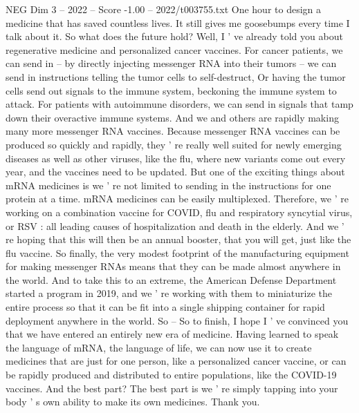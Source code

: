 \begin{textsample}{NEG Dim 3 – 2022 – Score -1.00 – 2022/t003755.txt}
One hour to design a medicine that has saved countless lives.
It still gives me goosebumps every time I talk about it.
So what does the future hold?
Well, I ' ve already told you about regenerative medicine and personalized cancer vaccines.
For cancer patients, we can send in -- by directly injecting messenger RNA into their tumors -- we can send in instructions telling the tumor cells to self-destruct, Or having the tumor cells send out signals to the immune system, beckoning the immune system to attack.
For patients with autoimmune disorders, we can send in signals that tamp down their overactive immune systems.
And we and others are rapidly making many more messenger RNA vaccines.
Because messenger RNA vaccines can be produced so quickly and rapidly, they ' re really well suited for newly emerging diseases as well as other viruses, like the flu, where new variants come out every year, and the vaccines need to be updated.
But one of the exciting things about mRNA medicines is we ' re not limited to sending in the instructions for one protein at a time. mRNA medicines can be easily multiplexed.
Therefore, we ' re working on a combination vaccine for COVID, flu and respiratory syncytial virus, or RSV : all leading causes of hospitalization and death in the elderly.
And we ' re hoping that this will then be an annual booster, that you will get, just like the flu vaccine.
So finally, the very modest footprint of the manufacturing equipment for making messenger RNAs means that they can be made almost anywhere in the world.
And to take this to an extreme, the American Defense Department started a program in 2019, and we ' re working with them to miniaturize the entire process so that it can be fit into a single shipping container for rapid deployment anywhere in the world.
So -- So to finish, I hope I ' ve convinced you that we have entered an entirely new era of medicine.
Having learned to speak the language of mRNA, the language of life, we can now use it to create medicines that are just for one person, like a personalized cancer vaccine, or can be rapidly produced and distributed to entire populations, like the COVID-19 vaccines.
And the best part?
The best part is we ' re simply tapping into your body ' s own ability to make its own medicines.
Thank you.

\end{textsample}
